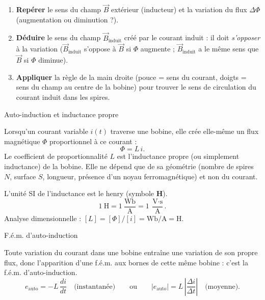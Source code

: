 \documentclass[11pt]{article}
\newcommand{\cle}[1]{{\popxbold\color{popdark}#1}}
\begin{document}
\begin{methode}
\begin{enumerate}
\item \textbf{Repérer} le sens du champ $\vec{B}$ extérieur (inducteur) et la variation du flux $\Delta\Phi$ (augmentation ou diminution ?).
\item \textbf{Déduire} le sens du champ $\vec{B}_{\text{induit}}$ créé par le courant induit : il doit \emph{s'opposer} à la variation ($\vec{B}_{\text{induit}}$ s'oppose à $\vec{B}$ si $\Phi$ augmente ; $\vec{B}_{\text{induit}}$ a le même sens que $\vec{B}$ si $\Phi$ diminue).
\item \textbf{Appliquer} la règle de la main droite (pouce = sens du courant, doigts = sens du champ au centre de la bobine) pour trouver le sens de circulation du courant induit dans les spires.
\end{enumerate}
\end{methode}

\begin{definition}Auto-induction et inductance propre\end{definition}

Lorsqu'un courant variable $i(t)$ traverse une bobine, elle crée elle-même un flux magnétique $\Phi$ proportionnel à ce courant :
\[ \Phi = L\,i. \]
Le coefficient de proportionnalité $L$ est l'\cle{inductance propre} (ou simplement \cle{inductance}) de la bobine. Elle ne dépend que de sa géométrie (nombre de spires $N$, surface $S$, longueur, présence d'un noyau ferromagnétique) et non du courant.

\begin{aretenir}
L'unité SI de l'inductance est le \cle{henry} (symbole \textbf{H}).
\[ 1~\text{H} = 1~\frac{\text{Wb}}{\text{A}} = 1~\frac{\text{V}\cdot\text{s}}{\text{A}}. \]
Analyse dimensionnelle : $[L] = [\Phi]/[i] = \text{Wb}/\text{A} = \text{H}$.
\end{aretenir}

\begin{propriete}F.é.m. d'auto-induction\end{propriete}

Toute variation du courant dans une bobine entraîne une variation de son propre flux, donc l'apparition d'une f.é.m. aux bornes de cette même bobine : c'est la \cle{f.é.m. d'auto-induction}.
\[ e_{\text{auto}} = -L\,\frac{di}{dt} \quad \text{(instantanée)} \qquad \text{ou} \qquad |e_{\text{auto}}| = L\,\left|\frac{\Delta i}{\Delta t}\right| \quad \text{(moyenne)}. \]
\end{document}
